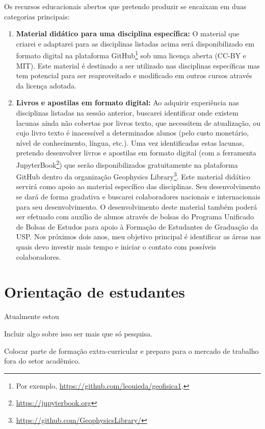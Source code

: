 \documentclass[12pt,a4paper,oneside]{book}
\begin{document}
Os recursos educacionais abertos que pretendo produzir se encaixam em duas
categorias principais:

\begin{enumerate}
  \item \textbf{Material didático para uma disciplina específica:} O material
    que criarei e adaptarei para as disciplinas listadas acima será
    disponibilizado em formato digital na plataforma GitHub\footnote{Por exemplo,
    \url{https://github.com/leouieda/geofisica1}.} sob uma licença aberta (CC-BY
    e MIT). Este material é destinado a ser utilizado nas disciplinas
    específicas mas tem potencial para ser reaproveitado e modificado em outros
    cursos através da licença adotada.
  \item \textbf{Livros e apostilas em formato digital:}
    Ao adquirir experiência nas disciplinas listadas na sessão anterior,
    buscarei identificar onde existem lacunas ainda não cobertas por livros
    texto, que necessitem de atualização, ou cujo livro texto é inacessível a
    determinados alunos (pelo custo monetário, nível de conhecimento, língua,
    etc.). Uma vez identificadas estas lacunas, pretendo desenvolver livros e
    apostilas em formato digital (com a ferramenta
    JupyterBook\footnote{\url{https://jupyterbook.org}}) que serão
    disponibilizados gratuitamente na plataforma GitHub dentro da organização
    Geophysics Library\footnote{\url{https://github.com/GeophysicsLibrary/}}.
    Este material didático servirá como apoio ao material específico das
    disciplinas. Seu desenvolvimento se dará de forma gradativa e buscarei
    colaboradores nacionais e internacionais para seu desenvolvimento.
    O desenvolvimento deste material também poderá ser efetuado com auxílio
    de alunos através de bolsas do Programa Unificado de Bolsas de Estudos para
    apoio à Formação de Estudantes de Graduação da USP. Nos
    próximos dois anos, meu objetivo principal é identificar as áreas nas quais
    devo investir mais tempo e iniciar o contato com possíveis colaboradores.
\end{enumerate}


\section{Orientação de estudantes}

Atualmente estou

Incluir algo sobre isso ser mais que só pesquisa.

Colocar parte de formação extra-curricular e preparo para o mercado de trabalho
fora do setor acadêmico.
\end{document}
